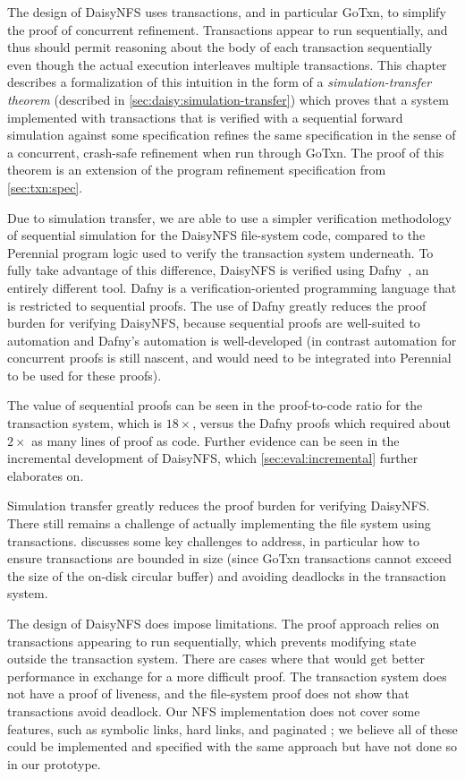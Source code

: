 The design of DaisyNFS uses transactions, and in particular GoTxn, to simplify
the proof of concurrent refinement. Transactions appear to run
sequentially, and thus should permit reasoning about the body of each
transaction sequentially even though the actual execution interleaves multiple
transactions. This chapter describes a formalization of this intuition in the
form of a \emph{simulation-transfer theorem} (described in
\cref{sec:daisy:simulation-transfer}) which proves that a system implemented
with transactions that is verified with a sequential forward simulation against
some specification refines the same specification in the sense of a concurrent,
crash-safe refinement when run through GoTxn. The proof of this theorem is an
extension of the program refinement specification from \cref{sec:txn:spec}.

Due to simulation transfer, we are able to use a simpler verification
methodology of sequential simulation for the DaisyNFS file-system code, compared
to the Perennial program logic used to verify the transaction system underneath.
To fully take advantage of this difference, DaisyNFS is verified using
Dafny~\cite{leino:dafny}, an entirely different tool. Dafny is a
verification-oriented programming language that is restricted to sequential
proofs. The use of Dafny greatly reduces the proof burden for verifying
DaisyNFS, because sequential proofs are well-suited to automation and Dafny's
automation is well-developed (in contrast automation for concurrent proofs is
still nascent, and would need to be integrated into Perennial to be used for
these proofs).

The value of sequential proofs can be seen in the proof-to-code ratio for the
transaction system, which is $18\times$, versus the Dafny proofs which required
about $2\times$ as many lines of proof as code. Further evidence can be seen in
the incremental development of DaisyNFS, which \cref{sec:eval:incremental}
further elaborates on.

Simulation transfer greatly reduces the proof burden for verifying DaisyNFS.
There still remains a challenge of actually implementing the file system using
transactions.  discusses some key challenges to address,
in particular how to ensure transactions are bounded in size (since GoTxn
transactions cannot exceed the size of the on-disk circular buffer) and avoiding
deadlocks in the transaction system.

The design of DaisyNFS does impose limitations. The proof approach relies on
transactions appearing to run sequentially, which prevents modifying state
outside the transaction system. There are cases where that would get better
performance in exchange for a more difficult proof. The transaction system does
not have a proof of liveness, and the file-system proof does not show that
transactions avoid deadlock. Our NFS implementation does not cover some
features, such as symbolic links, hard links, and paginated ; we
believe all of these could be implemented and specified with the same approach
but have not done so in our prototype.
